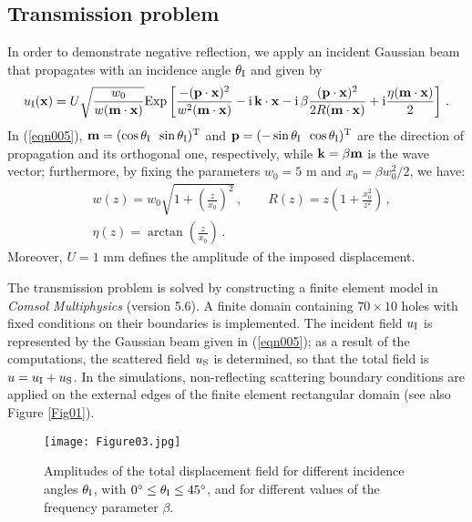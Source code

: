 \documentclass[10p]{article}
\begin{document}
\subsection{Transmission problem}
\label{Sect1.2}

In order to demonstrate negative reflection, we apply an incident Gaussian beam\cite{Svelto2010} that propagates with an incidence angle $\theta_{\textup I}$ and given by
\begin{equation}
\label{eqn005}
u_{\textup I}({\bf x})=U\sqrt{\frac{w_0}{w({\bf m}\cdot{\bf x})}}
\mbox{Exp}\left[\frac{-({\bf p}\cdot{\bf x})^2}{w^2({\bf m}\cdot{\bf x})}-\mathrm{i}\,{\bf k}\cdot{\bf x}-\mathrm{i}\,\beta\frac{({\bf p}\cdot{\bf x})^2}{2R({\bf m}\cdot{\bf x})}+\mathrm{i}\frac{\eta({\bf m}\cdot{\bf x})}{2}  \right]\,.
\end{equation}
In (\ref{eqn005}), ${\bf m}=(\cos\theta_{\textup I}\,\,\,\sin\theta_{\textup I})^{\textup T}$ and ${\bf p}=(-\sin\theta_{\textup I}\,\,\,\cos\theta_{\textup I})^{\textup T}$ are the direction of propagation and its orthogonal one, respectively, while ${\bf k}=\beta {\bf m}$ is the wave vector; furthermore, by fixing the parameters $w_0=5$ m and $x_0=\beta w_0^2/2$, we have:
\begin{eqnarray}
\label{eqn006}
\nonumber
& \displaystyle{w(z) =  w_0 \sqrt{1+\left(\frac{z}{x_0}\right)^2}\,, \qquad 
R(z) = z \left(1 + \frac{x_0^2}{z^2}\right)\,,} \\ & 
\displaystyle{\eta(z)=\arctan\left(\frac{z}{x_0}\right)\,.} 
\end{eqnarray}
Moreover, $U=1$ mm defines the amplitude of the imposed displacement.

The transmission problem is solved by constructing a finite element model in \emph{Comsol Multiphysics} (version 5.6). A finite domain containing $70\times 10$ holes with fixed conditions on their boundaries is implemented. The incident field $u_\textup{I}$ is represented by the Gaussian beam given in (\ref{eqn005}); as a result of the computations, the scattered field $u_\textup{S}$ is determined, so that the total field is $u=u_\textup{I}+u_\textup{S}$.
In the simulations, non-reflecting scattering boundary conditions are applied on the external edges of the finite element rectangular domain (see also Figure \ref{Fig01}).

\begin{figure}
\begin{center}
\texttt{[image: Figure03.jpg]}
\end{center}
\caption{\label{Fig03}Amplitudes of the total displacement field for different incidence angles $\theta_\textup{I}$, with $0^\circ \le \theta_\textup{I} \le 45^\circ$, and for different values of the frequency parameter $\beta$.}
\end{figure}
\end{document}
